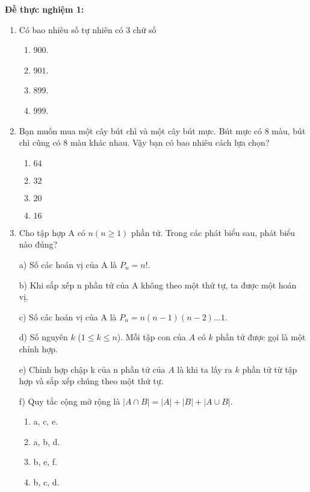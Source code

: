 \noindent\textbf{Đề thực nghiệm 1:}\par
\begin{enumerate}[label=\textbf{Câu \arabic*.},align=left,left=0cm..0cm,itemindent=*]
	\item Có bao nhiêu số tự nhiên có 3 chữ số
	\begin{multicols}{4}\begin{enumerate}[label=\textbf{\Alph*.},align=left,left=1cm..0cm,itemindent=*]
		\item $900$. \item $901$. \item $899$. \item $999$.
	\end{enumerate}\end{multicols}
	\item Bạn muốn mua một cây bút chì và một cây bút mực. Bút mực có 8 màu, bút chì cũng có 8 màu khác nhau. Vậy bạn có bao nhiêu cách lựa chọn?
	\begin{multicols}{4}\begin{enumerate}[label=\textbf{\Alph*.},align=left,left=1cm..0cm,itemindent=*]
		\item $64$ \item $32$ \item $20$ \item $16$
	\end{enumerate}\end{multicols}
	\item Cho tập hợp A có $n (n\geqslant 1)$ phần tử. Trong các phát biểu sau, phát biểu nào đúng?\par
	a) Số các hoán vị của A là $P_n=n!$.\par
	b) Khi sắp xếp n phần tử của A không theo một thứ tự, ta được một hoán vị.\par
	c) Số các hoán vị của A là $P_n=n(n-1)(n-2)...1$.\par
	d) Số nguyên $k$ ($1\leqslant k\leqslant n$). Mỗi tập con của $A$ có $k$ phần tử được gọi là một chỉnh hợp.\par
	e) Chỉnh hợp chập k của n phần tử của $A$ là khi ta lấy ra $k$ phần tử từ tập hợp và sắp xếp chúng theo một thứ tự.\par
	f) Quy tắc cộng mở rộng là $|A\cap B|=|A|+|B|+|A\cup B|.$
	\begin{multicols}{4}\begin{enumerate}[label=\textbf{\Alph*.},align=left,left=1cm..0cm,itemindent=*]
		\item a, c, e. \item a, b, d. \item b, e, f. \item b, c, d.

\end{enumerate}
\end{multicols}
\end{enumerate}
